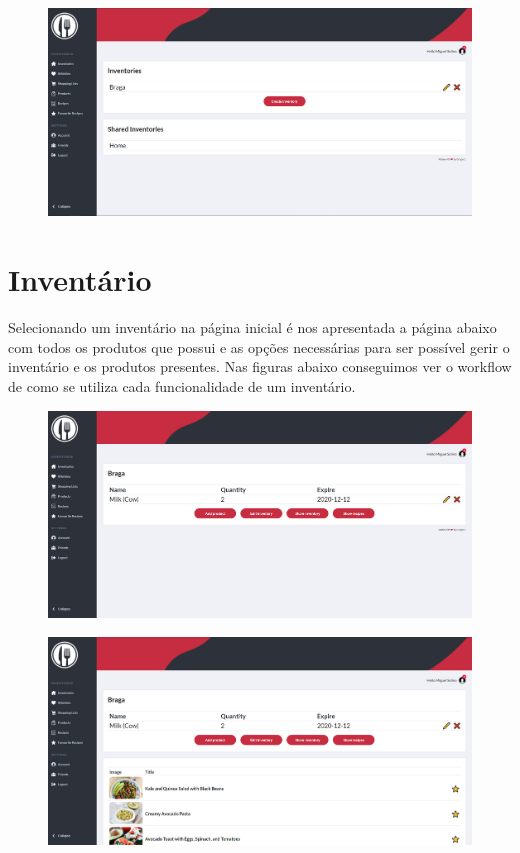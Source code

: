 \documentclass[a4paper]{report}
\begin{document}
    \begin{figure}[H]
        \centering
            \includegraphics[width=\textwidth]{images/produto_final/inicial.png}
    \end{figure}

    \section{Inventário}

    Selecionando um inventário na página inicial é nos apresentada a página
    abaixo com todos os produtos que possui e as opções necessárias para 
    ser possível gerir o inventário e os produtos presentes. Nas figuras
    abaixo conseguimos ver o workflow de como se utiliza cada funcionalidade
    de um inventário.

    \begin{figure}[H]
        \centering
            \includegraphics[width=\textwidth]{images/produto_final/iventario.png}
    \end{figure}

    \begin{figure}[H]
        \centering
            \includegraphics[width=\textwidth]{images/produto_final/iventario_receitas.png}
    \end{figure}
\end{document}
